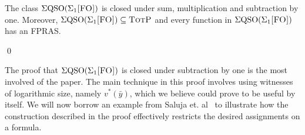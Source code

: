 \begin{thm}\label{sigmafo-minusone}
The class $\Sigma{\rm QSO}(\Sigma_{1}\textsc{[FO]})$ is closed under sum, multiplication and subtraction by one. Moreover, $\Sigma{\rm QSO}(\Sigma_{1}\textsc{[FO]}) \subseteq \text{\sc TotP}$ and every function in $\Sigma{\rm QSO}(\Sigma_{1}\textsc{[FO]})$ has an FPRAS.
\end{thm}
\begin{leftbar}
\proof

\qed
\end{leftbar}
The proof that $\Sigma{\rm QSO}(\Sigma_{1}\textsc{[FO]})$ is closed under subtraction by one is the most involved of the paper.
The main technique in this proof involves using witnesses of logarithmic size, namely $v^{*}(\bar{y})$, which we believe could prove to be useful by itself. 
We will now borrow an example from Saluja et. al~\cite{SalujaST95} to illustrate how the construction described in the proof effectively restricts the desired assignments on a formula.
\begin{exa}

\end{exa}
